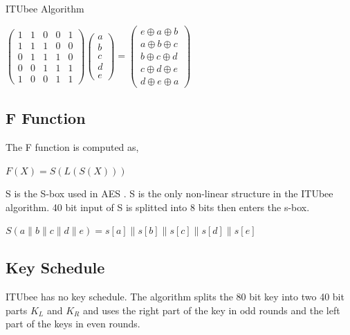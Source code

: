 \begin{section}{ITUbee Algorithm}
\begin{center}
    $
    \begin{pmatrix}
    1 & 1 & 0 & 0 & 1 \\
    1 & 1 & 1 & 0 & 0 \\
    0 & 1 & 1 & 1 & 0 \\
    0 & 0 & 1 & 1 & 1 \\
    1 & 0 & 0 & 1 & 1
    \end{pmatrix}
    \begin{pmatrix}
    a \\
    b \\
    c \\
    d \\
    e
    \end{pmatrix}
    =
    \begin{pmatrix}
    e \oplus a \oplus b \\
    a \oplus b \oplus c \\
    b \oplus c \oplus d \\
    c \oplus d \oplus e \\
    d \oplus e \oplus a
    \end{pmatrix}
    $
\end{center}


\subsection{F Function}
The F function is computed as,\\
\begin{center}
    $F (X) = S(L(S(X)))$
\end{center}

S is the S-box used in AES \cite{dworkin2001advanced}. S is the only non-linear structure in the ITUbee algorithm.  40 bit input of S is splitted into 8 bits then enters the s-box.
\begin{center}
    $S(a\parallel b \parallel c \parallel d \parallel e) = s[a] \parallel s[b] \parallel s[c] \parallel s[d] \parallel s[e]$ 
\end{center}

\subsection{Key Schedule}

ITUbee has no key schedule. The algorithm splits the 80 bit key into two 40 bit parts $K_L$ and $K_R$ and uses the right part of the key in odd rounds and the left part of the keys in even rounds.



\end{section}